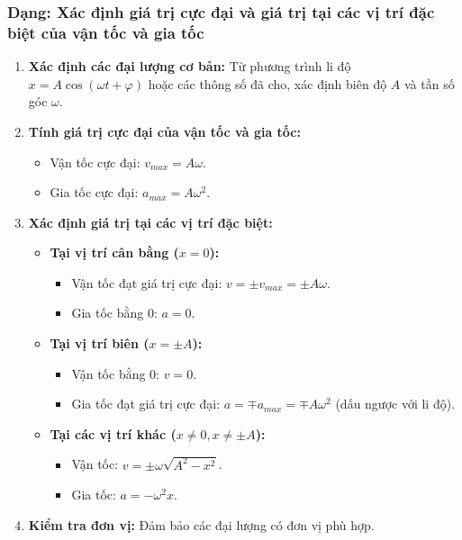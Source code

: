 \subsubsection{Dạng: Xác định giá trị cực đại và giá trị tại các vị trí đặc biệt của vận tốc và gia tốc}
\begin{phuongphap}
\begin{enumerate}
    \item \textbf{Xác định các đại lượng cơ bản:} Từ phương trình li độ $x = A\cos(\omega t + \varphi)$ hoặc các thông số đã cho, xác định biên độ $A$ và tần số góc $\omega$.
    \item \textbf{Tính giá trị cực đại của vận tốc và gia tốc:}
    \begin{itemize}
        \item Vận tốc cực đại: $v_{max} = A\omega$.
        \item Gia tốc cực đại: $a_{max} = A\omega^2$.
    \end{itemize}
    \item \textbf{Xác định giá trị tại các vị trí đặc biệt:}
    \begin{itemize}
        \item \textbf{Tại vị trí cân bằng ($x=0$):}
        \begin{itemize}
            \item Vận tốc đạt giá trị cực đại: $v = \pm v_{max} = \pm A\omega$.
            \item Gia tốc bằng 0: $a = 0$.
        \end{itemize}
        \item \textbf{Tại vị trí biên ($x=\pm A$):}
        \begin{itemize}
            \item Vận tốc bằng 0: $v = 0$.
            \item Gia tốc đạt giá trị cực đại: $a = \mp a_{max} = \mp A\omega^2$ (dấu ngược với li độ).
        \end{itemize}
        \item \textbf{Tại các vị trí khác ($x \ne 0, x \ne \pm A$):}
        \begin{itemize}
            \item Vận tốc: $v = \pm \omega\sqrt{A^2 - x^2}$.
            \item Gia tốc: $a = -\omega^2 x$.
        \end{itemize}
    \end{itemize}
    \item \textbf{Kiểm tra đơn vị:} Đảm bảo các đại lượng có đơn vị phù hợp.
\end{enumerate}
\end{phuongphap}

